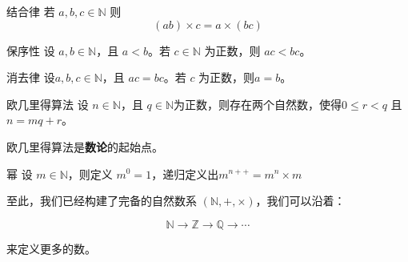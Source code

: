 \begin{theorem}{结合律}{}
	若 $a,b,c\in\mathbb N$ 则
	$$
	(ab)\times c = a\times (bc)
	$$
\end{theorem}


\begin{theorem}{保序性}{}
	设 $a,b\in \mathbb N$，且 $a<b$。若 $c\in \mathbb N$ 为正数，则 $ac<bc$。
\end{theorem}

\begin{theorem}{消去律}{}
	设$a,b,c\in \mathbb N$，且 $ac=bc$。若 $c$ 为正数，则$a=b$。
\end{theorem}

\begin{theorem}{欧几里得算法}{}
	设 $n\in \mathbb N$，且 $q\in \mathbb N$为正数，则存在两个自然数，使得$0\le r < q$ 且 $n=mq+r$。
\end{theorem}

\begin{note}
	欧几里得算法是\textbf{数论}的起始点。
\end{note}

\begin{definition}{幂}{}
	设 $m\in \mathbb N$，则定义 $m^0=1$，递归定义出$m^{n++}=m^n\times m$
\end{definition}


至此，我们已经构建了完备的自然数系 $(\mathbb N, +, \times)$，我们可以沿着：

$$
\mathbb N\rightarrow \mathbb Z\rightarrow \mathbb Q\rightarrow \cdots
$$

\noindent 来定义更多的数。


